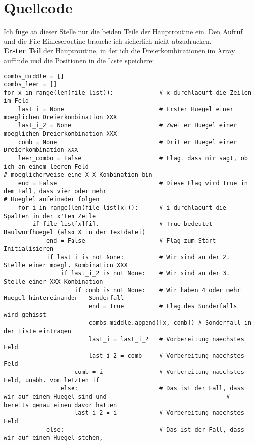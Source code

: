 \documentclass[a4paper,10pt,ngerman]{scrartcl}
\begin{document}
\section{Quellcode}
Ich füge an dieser Stelle nur die beiden Teile der Hauptroutine ein. Den Aufruf und die File-Einleseroutine brauche ich sicherlich nicht abzudrucken.\\
\textbf{Erster Teil} der Hauptroutine, in der ich die Dreierkombinationen im Array auffinde und die Positionen in die Liste speichere:
\begin{lstlisting}
combs_middle = []
combs_leer = []
for x in range(len(file_list)):             # x durchlaeuft die Zeilen im Feld
    last_i = None                           # Erster Huegel einer moeglichen Dreierkombination XXX
    last_i_2 = None                         # Zweiter Huegel einer moeglichen Dreierkombination XXX
    comb = None                             # Dritter Huegel einer Dreierkombination XXX
    leer_combo = False                      # Flag, dass mir sagt, ob ich an einem leeren Feld                                                  # moeglicherweise eine X X Kombination bin
    end = False                             # Diese Flag wird True in dem Fall, dass vier oder mehr                                             # Hueglel aufeinader folgen
    for i in range(len(file_list[x])):      # i durchlaeuft die Spalten in der x'ten Zeile
        if file_list[x][i]:                 # True bedeutet Baulwurfhuegel (also X in der Textdatei)
            end = False                     # Flag zum Start Initialisieren
            if last_i is not None:          # Wir sind an der 2. Stelle einer moegl. Kombination XXX
                if last_i_2 is not None:    # Wir sind an der 3. Stelle einer XXX Kombination
                    if comb is not None:    # Wir haben 4 oder mehr Huegel hintereinander - Sonderfall
                        end = True          # Flag des Sonderfalls wird gehisst
                        combs_middle.append([x, comb]) # Sonderfall in der Liste eintragen
                        last_i = last_i_2   # Vorbereitung naechstes Feld
                        last_i_2 = comb     # Vorbereitung naechstes Feld
                    comb = i                # Vorbereitung naechstes Feld, unabh. vom letzten if
                else:                       # Das ist der Fall, dass wir auf einem Huegel sind und                                  # bereits genau einen davor hatten
                    last_i_2 = i            # Vorbereitung naechstes Feld
            else:                           # Das ist der Fall, dass wir auf einem Huegel stehen, 

\end{lstlisting}
\end{document}
